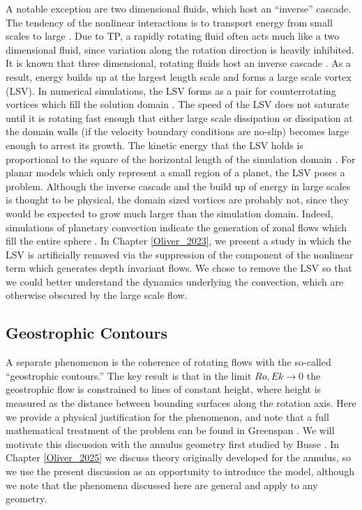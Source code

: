 A notable exception are two dimensional fluids, which host an ``inverse'' cascade. 
The tendency of the nonlinear interactions is to transport energy from small scales to large \citep{rK67,jM84}. Due to TP, a rapidly rotating fluid often acts much like a two dimensional fluid, since variation along the rotation direction is heavily inhibited. 
It is known that three dimensional, rotating fluids host an inverse cascade \citep{kC07,cG14,sS14}. 
As a result, energy builds up at the largest length scale and forms a large scale vortex (LSV). In numerical simulations, the LSV forms as a pair for counterrotating vortices which fill the solution domain \citep{aR14,sM21}. 
The speed of the LSV does not saturate until it is rotating fast enough that either large scale dissipation or dissipation at the domain walls (if the velocity boundary conditions are no-slip) becomes large enough to arrest its growth. 
The kinetic energy that the LSV holds is proportional to the square of the horizontal length of the simulation domain \citep{bF14}. 
For planar models which only represent a small region of a planet, the LSV poses a problem. 
Although the inverse cascade and the build up of energy in large scales is thought to be physical, the domain sized vortices are probably not, since they would be expected to grow much larger than the simulation domain. 
Indeed, simulations of planetary convection indicate the generation of zonal flows which fill the entire sphere \citep{cJ03,yL21,jN24,sT24}.
In Chapter \ref{Oliver_2023}, we present a study in which the LSV is artificially removed via the suppression of the component of the nonlinear term which generates depth invariant flows. We chose to remove the LSV so that we could better understand the dynamics underlying the convection, which are otherwise obscured by the large scale flow.

\subsection{Geostrophic Contours}
A separate phenomenon is the coherence of rotating flows with the so-called ``geostrophic contours.''
The key result is that in the limit $Ro,Ek\rightarrow0$ the geostrophic flow is constrained to lines of constant height, where height is measured as the distance between bounding surfaces along the rotation axis. 
Here we provide a physical justification for the phenomenon, and note that a full mathematical treatment of the problem can be found in Greenspan \cite{hG68}.
We will motivate this discussion with the annulus geometry first studied by Busse \citep{fB70}. 
In Chapter \ref{Oliver_2025} we discuss theory originally developed for the annulus, so we use the present discussion as an opportunity to introduce the model, although we note that the phenomena discussed here are general and apply to any geometry.

